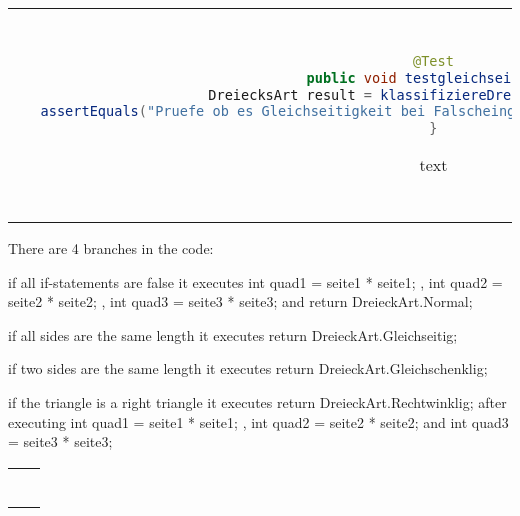 \begin{parlist}
\begin{center}
\begin{tabular}{ | c | c | }
\begin{lstlisting}[language=java,frame=trBL]
@Test
public void testgleichseitig(){
   DreiecksArt result = klassifiziereDreieck(null,null,null);
   assertEquals("Pruefe ob es Gleichseitigkeit bei Falscheingabe erkennt", DriecksArt.Normal, result);
}
  \end{lstlisting} text& Need to check if it will recognize equallateral triangles even if it has bad input. \\
\end{tabular}
\end{center}

\item There are 4 branches in the code:
\begin{list}
\item if all if-statements are false it executes int quad1 = seite1 * seite1; , int quad2 = seite2 * seite2; ,
int quad3 = seite3 * seite3; and return DreieckArt.Normal; 
\item if all sides are the same length it executes return DreieckArt.Gleichseitig;
\item if two sides are the same length it executes return DreieckArt.Gleichschenklig;
\item if the triangle is a right triangle it executes return DreieckArt.Rechtwinklig; after executing int quad1 = seite1 * seite1; , int quad2 = seite2 * seite2; and int quad3 = seite3 * seite3;
\end{list}

\begin{center}
\begin{tabular}{ | c | c | } 
  \hline
  \begin{lstlisting}[language=java,frame=trBL]


\end{lstlisting}
\end{tabular}
\end{center}
\end{parlist}
